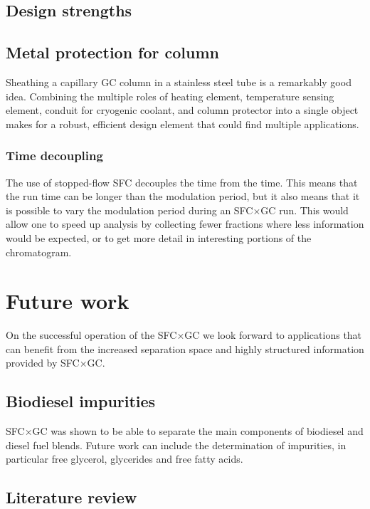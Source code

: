 \subsection{Design strengths}

\subsection{Metal protection for column}

Sheathing a capillary GC column in a stainless steel tube is a remarkably good
idea. Combining the multiple roles of heating element, temperature sensing
element, conduit for cryogenic coolant, and column protector into a single
object makes for a robust, efficient design element that could find multiple
applications.

\subsubsection{Time decoupling}

The use of stopped-flow SFC decouples the \oneD time from the \twoD time. This
means that the \twoD run time can be longer than the modulation period, but it
also means that it is possible to vary the modulation period during an SFC×GC
run. This would allow one to speed up analysis by collecting fewer fractions
where less information would be expected, or to get more detail in interesting
portions of the \oneD chromatogram.

\section{Future work}

On the successful operation of the SFC×GC we look forward to applications that
can benefit from the increased separation space and highly structured
information provided by SFC×GC.

\subsection{Biodiesel impurities}

SFC×GC was shown to be able to separate the main components of biodiesel and
diesel fuel blends. Future work can include the determination of impurities, in
particular free glycerol, glycerides and free fatty acids.

\subsection{Literature review}

